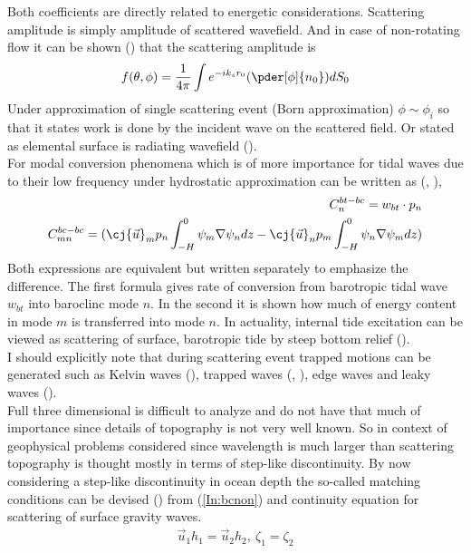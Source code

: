 Both coefficients are directly related to energetic considerations. Scattering amplitude is simply amplitude of scattered wavefield. And in case of non-rotating flow it can be shown (\cite{morse1946methods}) that the scattering amplitude is
\begin{align}
f(\theta, \phi) = \frac{1}{4 \pi} \int e^{-i k_s r_0} (\pder[\phi]{n_0}) d S_0
\end{align}
Under approximation of single scattering event (Born approximation) $\phi \sim \phi_i$ so that it states work is done by the incident wave on the scattered field. Or stated as elemental surface is radiating wavefield (\cite{landau1988hydrodynamics}).\\
For modal conversion phenomena which is of more importance for tidal waves due to their low frequency under hydrostatic approximation can be written as (\cite{griffiths2007internal}, \cite{kelly2012cascade}), 
\begin{align}
C_{n}^{bt-bc} = w_{bt} \cdot p_n\\
C_{mn}^{bc-bc} = (\cj{\vec{u}}_m p_n \int_{-H}^0 \psi_m \nabla \psi_n dz - \cj{\vec{u}}_n p_m \int_{-H}^0 \psi_n \nabla \psi_m dz)
\end{align}
Both expressions are equivalent but written separately to emphasize the difference. The first formula gives rate of conversion from barotropic tidal wave $w_{bt}$ into baroclinc mode $n$. In the second it is shown how much of energy content in mode $m$ is transferred into mode $n$.  In actuality, internal tide excitation can be viewed as scattering of surface, barotropic tide by steep bottom relief (\cite{hendershott1981long}).\\
I should explicitly note that during scattering event trapped motions can be generated such as Kelvin waves (\cite{pinsent1972kelvin}), trapped waves (\cite{longuet1967trapping}, \cite{kowalik2002tidal}), edge waves and leaky waves (\cite{leblond1978preface}).\\
Full three dimensional is difficult to analyze and do not have that much of importance since details of topography is not very well known. So in context of geophysical problems considered since wavelength is much larger than scattering topography is thought mostly in terms of step-like discontinuity. By now considering a step-like discontinuity in ocean depth the so-called matching conditions can be devised (\cite{mei1989theory}) from (\ref{In:bcnon}) and continuity equation for scattering of surface gravity waves.
\begin{align*}
\vec{u}_1 h_1 = \vec{u}_2 h_2,~\zeta_1 = \zeta_2
\end{align*}

